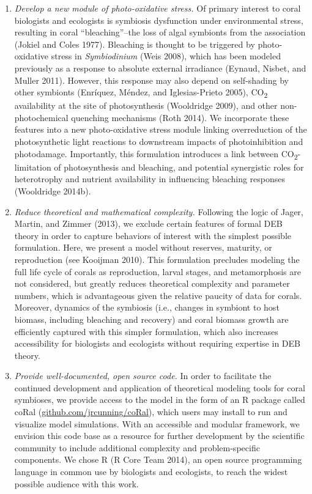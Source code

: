\documentclass[]{elsarticle} %
\begin{document}
\begin{enumerate}
\def\labelenumi{\arabic{enumi}.}
\item
  \emph{Develop a new module of photo-oxidative stress.} Of primary
  interest to coral biologists and ecologists is symbiosis dysfunction
  under environmental stress, resulting in coral ``bleaching''--the loss
  of algal symbionts from the association (Jokiel and Coles 1977).
  Bleaching is thought to be triggered by photo-oxidative stress in
  \emph{Symbiodinium} (Weis 2008), which has been modeled previously as
  a response to absolute external irradiance (Eynaud, Nisbet, and Muller
  2011). However, this response may also depend on self-shading by other
  symbionts (Enríquez, Méndez, and Iglesias-Prieto 2005),
  CO\textsubscript{2} availability at the site of photosynthesis
  (Wooldridge 2009), and other non-photochemical quenching mechanisms
  (Roth 2014). We incorporate these features into a new photo-oxidative
  stress module linking overreduction of the photosynthetic light
  reactions to downstream impacts of photoinhibition and photodamage.
  Importantly, this formulation introduces a link between
  CO\textsubscript{2}-limitation of photosynthesis and bleaching, and
  potential synergistic roles for heterotrophy and nutrient availability
  in influencing bleaching responses (Wooldridge 2014b).
\item
  \emph{Reduce theoretical and mathematical complexity.} Following the
  logic of Jager, Martin, and Zimmer (2013), we exclude certain features
  of formal DEB theory in order to capture behaviors of interest with
  the simplest possible formulation. Here, we present a model without
  reserves, maturity, or reproduction (see Kooijman 2010). This
  formulation precludes modeling the full life cycle of corals as
  reproduction, larval stages, and metamorphosis are not considered, but
  greatly reduces theoretical complexity and parameter numbers, which is
  advantageous given the relative paucity of data for corals. Moreover,
  dynamics of the symbiosis (i.e., changes in symbiont to host biomass,
  including bleaching and recovery) and coral biomass growth are
  efficiently captured with this simpler formulation, which also
  increases accessibility for biologists and ecologists without
  requiring expertise in DEB theory.
\item
  \emph{Provide well-documented, open source code.} In order to
  facilitate the continued development and application of theoretical
  modeling tools for coral symbioses, we provide access to the model in
  the form of an R package called coRal
  (\url{github.com/jrcunning/coRal}), which users may install to run and
  visualize model simulations. With an accessible and modular framework,
  we envision this code base as a resource for further development by
  the scientific community to include additional complexity and
  problem-specific components. We chose R (R Core Team 2014), an open
  source programming language in common use by biologists and
  ecologists, to reach the widest possible audience with this work.
\end{enumerate}
\end{document}
